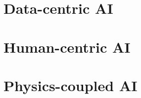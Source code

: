 \documentclass[a4paper,12pt,times,print,authoryear,index]{Classes/PhDThesisPSnPDF}
\begin{document}
\frontmatter

% 
\newpage
% 

% 



% 



\tableofcontents

\mainmatter
\sloppy
% 








\part{Data-centric AI}\label{part:data-centric}




\part{Human-centric AI}\label{part:human-centric}

% 





\part{Physics-coupled AI}\label{part:physics-aware}


% 


% 
% 







\end{document}
